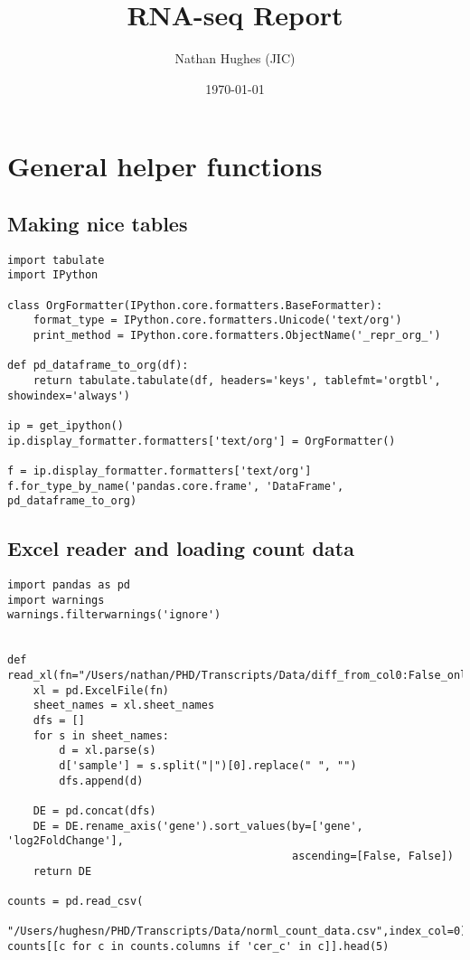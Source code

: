 \documentclass[a4paper]{article}
\author{Nathan Hughes (JIC)}
\date{\today}
\title{RNA-seq Report}
\begin{document}
\maketitle
\maketitle
\clearpage
\tableofcontents
\clearpage

\section{General helper functions}
\label{sec:orgcd628f4}

\subsection{Making nice tables}
\label{sec:orga1cf8fc}

\begin{verbatim}
import tabulate
import IPython

class OrgFormatter(IPython.core.formatters.BaseFormatter):
    format_type = IPython.core.formatters.Unicode('text/org')
    print_method = IPython.core.formatters.ObjectName('_repr_org_')

def pd_dataframe_to_org(df):
    return tabulate.tabulate(df, headers='keys', tablefmt='orgtbl', showindex='always')

ip = get_ipython()
ip.display_formatter.formatters['text/org'] = OrgFormatter()

f = ip.display_formatter.formatters['text/org']
f.for_type_by_name('pandas.core.frame', 'DataFrame', pd_dataframe_to_org)
\end{verbatim}


\subsection{Excel reader and loading count data}
\label{sec:org7e9ed19}
\begin{verbatim}
import pandas as pd
import warnings
warnings.filterwarnings('ignore')


def read_xl(fn="/Users/nathan/PHD/Transcripts/Data/diff_from_col0:False_onlyDiff:False.xlsx"):
    xl = pd.ExcelFile(fn)
    sheet_names = xl.sheet_names
    dfs = []
    for s in sheet_names:
        d = xl.parse(s)
        d['sample'] = s.split("|")[0].replace(" ", "")
        dfs.append(d)

    DE = pd.concat(dfs)
    DE = DE.rename_axis('gene').sort_values(by=['gene', 'log2FoldChange'],
                                            ascending=[False, False])
    return DE

counts = pd.read_csv(
    "/Users/hughesn/PHD/Transcripts/Data/norml_count_data.csv",index_col=0)
counts[[c for c in counts.columns if 'cer_c' in c]].head(5)
\end{verbatim}
\end{document}
